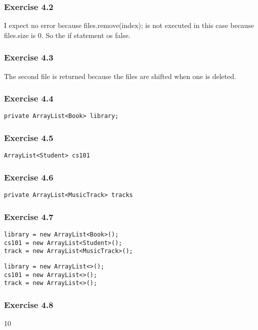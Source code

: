 \subsubsection{Exercise 4.2}
I expect no error because files.remove(index); is not executed in this case 
because files.size is 0. So the if statement os false. 

\subsubsection{Exercise 4.3}
The second file is returned because the files are shifted when one is deleted. 

\subsubsection{Exercise 4.4}
\begin{lstlisting}
private ArrayList<Book> library;
\end{lstlisting}

\subsubsection{Exercise 4.5}
\begin{lstlisting}
ArrayList<Student> cs101
\end{lstlisting}

\subsubsection{Exercise 4.6}
\begin{lstlisting}
private ArrayList<MusicTrack> tracks
\end{lstlisting}

\subsubsection{Exercise 4.7}
\begin{lstlisting}[caption=without diamond notation]
library = new ArrayList<Book>();
cs101 = new ArrayList<Student>();
track = new ArrayList<MusicTrack>();
\end{lstlisting}
\begin{lstlisting}[caption=with diamond notation]
library = new ArrayList<>();
cs101 = new ArrayList<>();
track = new ArrayList<>();
\end{lstlisting}

\subsubsection{Exercise 4.8}
10

